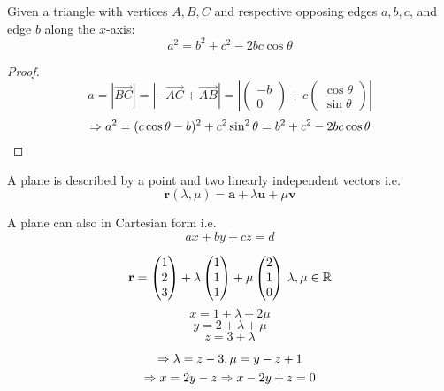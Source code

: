 \documentclass[a4paper,10pt]{article}
\begin{document}
\begin{thm}
	Given a triangle with vertices $A,B,C$ and respective opposing edges
	$a,b,c$, and edge $b$ along the $x$-axis:
	\[ a^2 = b^2 + c^2 - 2bc\cos\theta \]
\end{thm}

\begin{proof}
	\[
	a = |\vec{BC}| = |-\vec{AC} + \vec{AB}|
	= \left|\begin{pmatrix}-b\\0\end{pmatrix} + 
		c\begin{pmatrix}\cos\theta\\\sin\theta\end{pmatrix}\right|
	\]
	\[
	\Rightarrow a^2 = (c\cos\theta - b)^2 + c^2\sin^2\theta
	= b^2 + c^2 - 2bc\cos\theta
	\]
\end{proof}

A plane is described by a point and two linearly independent vectors i.e.
\[\mathbf{r}(\lambda, \mu) = \mathbf{a} + \lambda \mathbf{u} + \mu \mathbf{v}\]

A plane can also in Cartesian form i.e.
\[ax + by + cz = d\]

\begin{ex}
	\[
		\mathbf{r} = 
		\begin{pmatrix}
			1\\2\\3
		\end{pmatrix} 
		+ \lambda
		\begin{pmatrix}
			1\\1\\1
		\end{pmatrix}
		+ \mu
		\begin{pmatrix}
			2\\1\\0
		\end{pmatrix}
		\, \lambda, \mu \in \mathbb{R} 
	\]
	\[ x = 1 + \lambda + 2\mu \]
	\[ y = 2 + \lambda + \mu \]
	\[ z = 3 + \lambda \]

	\[ \Rightarrow \lambda = z - 3, \mu = y - z + 1 \]
	\[ \Rightarrow x = 2y - z \Rightarrow x - 2y + z = 0 \]
\end{ex}
\end{document}
